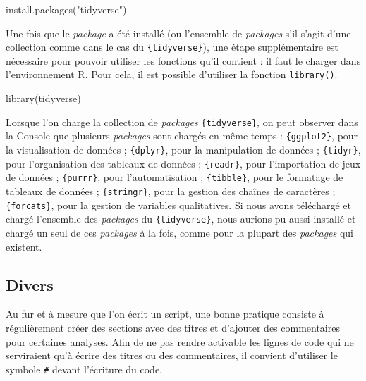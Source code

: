 \documentclass[
  letterpaper,
]{book}
\newenvironment{Shaded}{\begin{snugshade}}{\end{snugshade}}
\newcommand{\FunctionTok}[1]{\textcolor[rgb]{0.28,0.35,0.67}{#1}}
\newcommand{\NormalTok}[1]{\textcolor[rgb]{0.00,0.23,0.31}{#1}}
\newcommand{\StringTok}[1]{\textcolor[rgb]{0.13,0.47,0.30}{#1}}
\begin{document}
\begin{Shaded}
\begin{Highlighting}[]
\FunctionTok{install.packages}\NormalTok{(}\StringTok{"tidyverse"}\NormalTok{)}
\end{Highlighting}
\end{Shaded}

Une fois que le \emph{package} a été installé (ou l'ensemble de
\emph{packages} s'il s'agit d'une collection comme dans le cas du
\texttt{\{tidyverse\}}), une étape supplémentaire est nécessaire pour
pouvoir utiliser les fonctions qu'il contient : il faut le charger dans
l'environnement R. Pour cela, il est possible d'utiliser la fonction
\texttt{library()}.

\begin{Shaded}
\begin{Highlighting}[]
\FunctionTok{library}\NormalTok{(tidyverse)}
\end{Highlighting}
\end{Shaded}

Lorsque l'on charge la collection de \emph{packages}
\texttt{\{tidyverse\}}, on peut observer dans la Console que plusieurs
\emph{packages} sont chargés en même temps : \texttt{\{ggplot2\}}, pour
la visualisation de données ; \texttt{\{dplyr\}}, pour la manipulation
de données ; \texttt{\{tidyr\}}, pour l'organisation des tableaux de
données ; \texttt{\{readr\}}, pour l'importation de jeux de données ;
\texttt{\{purrr\}}, pour l'automatisation ; \texttt{\{tibble\}}, pour le
formatage de tableaux de données ; \texttt{\{stringr\}}, pour la gestion
des chaînes de caractères ; \texttt{\{forcats\}}, pour la gestion de
variables qualitatives. Si nous avons téléchargé et chargé l'ensemble
des \emph{packages} du \texttt{\{tidyverse\}}, nous aurions pu aussi
installé et chargé un seul de ces \emph{packages} à la fois, comme pour
la plupart des \emph{packages} qui existent.

\subsection{Divers}\label{divers}

Au fur et à mesure que l'on écrit un script, une bonne pratique consiste
à régulièrement créer des sections avec des titres et d'ajouter des
commentaires pour certaines analyses. Afin de ne pas rendre activable
les lignes de code qui ne serviraient qu'à écrire des titres ou des
commentaires, il convient d'utiliser le symbole \texttt{\#} devant
l'écriture du code.
\end{document}
